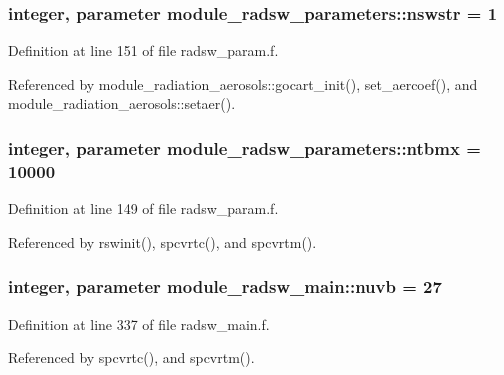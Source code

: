 \subsubsection[{\texorpdfstring{nswstr}{nswstr}}]{\setlength{\rightskip}{0pt plus 5cm}integer, parameter module\+\_\+radsw\+\_\+parameters\+::nswstr = 1}\hypertarget{group__module__radsw__main_ga3d4238ce9a40d70a6cdfe241d640ff5f}{}\label{group__module__radsw__main_ga3d4238ce9a40d70a6cdfe241d640ff5f}


Definition at line 151 of file radsw\+\_\+param.\+f.



Referenced by module\+\_\+radiation\+\_\+aerosols\+::gocart\+\_\+init(), set\+\_\+aercoef(), and module\+\_\+radiation\+\_\+aerosols\+::setaer().

\subsubsection[{\texorpdfstring{ntbmx}{ntbmx}}]{\setlength{\rightskip}{0pt plus 5cm}integer, parameter module\+\_\+radsw\+\_\+parameters\+::ntbmx = 10000}\hypertarget{group__module__radsw__main_ga4bd72558be40bfccfb78c48e640acd07}{}\label{group__module__radsw__main_ga4bd72558be40bfccfb78c48e640acd07}


Definition at line 149 of file radsw\+\_\+param.\+f.



Referenced by rswinit(), spcvrtc(), and spcvrtm().

\subsubsection[{\texorpdfstring{nuvb}{nuvb}}]{\setlength{\rightskip}{0pt plus 5cm}integer, parameter module\+\_\+radsw\+\_\+main\+::nuvb = 27\hspace{0.3cm}{\ttfamily [private]}}\hypertarget{group__module__radsw__main_ga177282b3087dce2f54f1233ee8631231}{}\label{group__module__radsw__main_ga177282b3087dce2f54f1233ee8631231}


Definition at line 337 of file radsw\+\_\+main.\+f.



Referenced by spcvrtc(), and spcvrtm().


